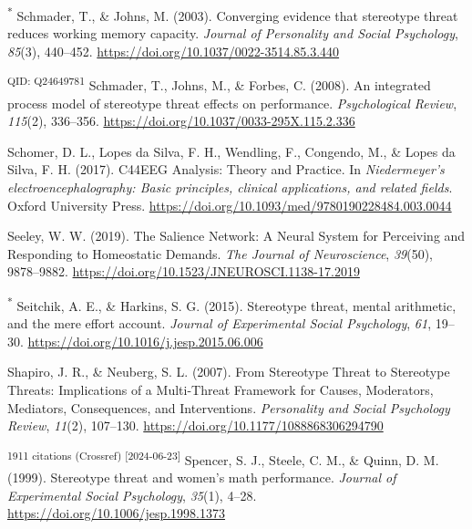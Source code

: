 \documentclass[
  stu, a4paper,floatsintext]{apa7}
\newlength{\cslhangindent}
\newenvironment{CSLReferences}[2] %
 {\begin{list}{}{%
  \setlength{\itemindent}{0pt}
  \setlength{\leftmargin}{0pt}
  \setlength{\parsep}{0pt}
  \ifodd #1
   \setlength{\leftmargin}{\cslhangindent}
   \setlength{\itemindent}{-1\cslhangindent}
  \fi
  \setlength{\itemsep}{#2\baselineskip}}}
 {\end{list}}
\begin{document}
\begin{CSLReferences}{1}{0}
\textsuperscript{*} Schmader, T., \& Johns, M. (2003). Converging evidence that stereotype threat reduces working memory capacity. \emph{Journal of Personality and Social Psychology}, \emph{85}(3), 440--452. \url{https://doi.org/10.1037/0022-3514.85.3.440}

\textsuperscript{QID: Q24649781} Schmader, T., Johns, M., \& Forbes, C. (2008). An integrated process model of stereotype threat effects on performance. \emph{Psychological Review}, \emph{115}(2), 336--356. \url{https://doi.org/10.1037/0033-295X.115.2.336}

Schomer, D. L., Lopes da Silva, F. H., Wendling, F., Congendo, M., \& Lopes da Silva, F. H. (2017). {C44EEG Analysis}: {Theory} and {Practice}. In \emph{Niedermeyer's electroencephalography: {Basic} principles, clinical applications, and related fields}. Oxford University Press. \url{https://doi.org/10.1093/med/9780190228484.003.0044}

Seeley, W. W. (2019). The {Salience Network}: {A Neural System} for {Perceiving} and {Responding} to {Homeostatic Demands}. \emph{The Journal of Neuroscience}, \emph{39}(50), 9878--9882. \url{https://doi.org/10.1523/JNEUROSCI.1138-17.2019}

\textsuperscript{*} Seitchik, A. E., \& Harkins, S. G. (2015). Stereotype threat, mental arithmetic, and the mere effort account. \emph{Journal of Experimental Social Psychology}, \emph{61}, 19--30. \url{https://doi.org/10.1016/j.jesp.2015.06.006}

Shapiro, J. R., \& Neuberg, S. L. (2007). From {Stereotype Threat} to {Stereotype Threats}: {Implications} of a {Multi-Threat Framework} for {Causes}, {Moderators}, {Mediators}, {Consequences}, and {Interventions}. \emph{Personality and Social Psychology Review}, \emph{11}(2), 107--130. \url{https://doi.org/10.1177/1088868306294790}

\textsuperscript{1911 citations (Crossref) {[}2024-06-23{]}} Spencer, S. J., Steele, C. M., \& Quinn, D. M. (1999). Stereotype threat and women's math performance. \emph{Journal of Experimental Social Psychology}, \emph{35}(1), 4--28. \url{https://doi.org/10.1006/jesp.1998.1373}


\end{CSLReferences}
\end{document}
